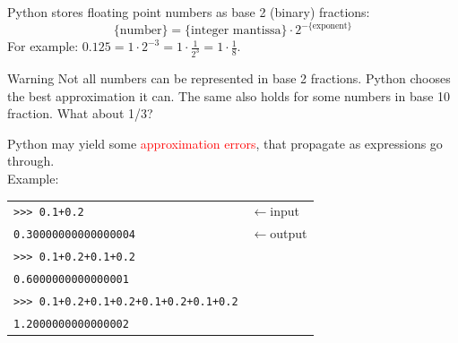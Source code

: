 \documentclass[t,handout,9pt]{beamer}
\begin{document}
\begin{frame}
Python stores floating point numbers as base 2 (binary) fractions:
\begin{equation*}
	\text{\{number\}} = \text{\{integer mantissa\}} \cdot 2^{-\text{\{exponent\}}}
\end{equation*}
For example: $0.125 = 1 \cdot 2^{-3} = 1\cdot \frac{1}{2^3}=1\cdot \frac{1}{8}$.
\begin{block}{Warning}
Not all numbers can be represented in base 2 fractions. Python chooses the best approximation it can. The same also holds for some numbers in base 10 fraction. What about 1/3?
\end{block}
Python may yield some \textcolor{red}{approximation errors}, that propagate as expressions go through.\\
Example:
\begin{table}[]
\begin{flushleft}
\begin{tabular}{ll}
\texttt{>{}>{}> 0.1+0.2} & $\leftarrow$input  \\
\texttt{0.30000000000000004}        & $\leftarrow$output\\
\texttt{>{}>{}> 0.1+0.2+0.1+0.2} & \\
\texttt{0.6000000000000001}        & \\
\texttt{>{}>{}> 0.1+0.2+0.1+0.2+0.1+0.2+0.1+0.2} & \\
\texttt{1.2000000000000002}        & %
\end{tabular}
\end{flushleft}
\end{table}
\end{frame}
%
\end{document}

